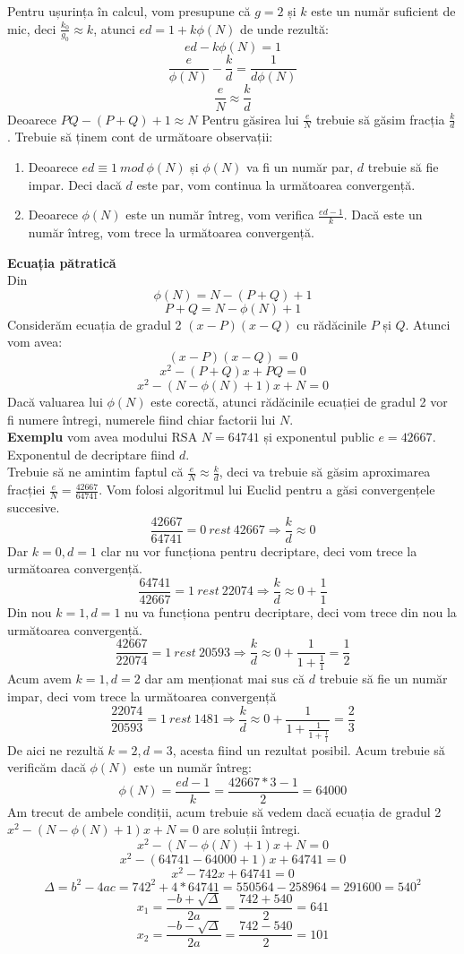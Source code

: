 \documentclass[12]{article}
\begin{document}
Pentru ușurința în calcul, vom presupune că $g=2$ și $k$ este un număr suficient de mic, deci $\frac{k_0}{g_0} \approx k$, atunci $ed = 1+k\phi(N)$ de unde rezultă:
$$ ed-k\phi(N)=1$$
$$ \frac{e}{\phi(N)} - \frac{k}{d} = \frac{1}{d\phi(N)}$$
$$ \frac{e}{N} \approx \frac{k}{d} $$ 
Deoarece $PQ - (P+Q)+1 \approx N$
Pentru găsirea lui $\frac{e}{N}$ trebuie să găsim fracția $\frac{k}{d}$. Trebuie să ținem cont de următoare observații:
\begin{enumerate}
\item Deoarece $ed \equiv 1 \ mod \ \phi(N)$ și $\phi(N)$ va fi un număr par, $d$ trebuie să fie impar. Deci dacă $d$ este par, vom continua la următoarea convergență.

\item Deoarece $\phi(N)$ este un număr întreg, vom verifica  $\frac{ed -1}{k}$. Dacă este un număr întreg, vom trece la următoarea convergență.

\end{enumerate}
\textbf{Ecuația pătratică} \\
Din
$$ \phi(N)=N-(P+Q)+1$$
$$ P+Q = N - \phi(N) +1$$
Considerăm ecuația de gradul 2 $(x-P)(x-Q)$ cu rădăcinile $P$ și $Q$. Atunci vom avea:
$$(x-P)(x-Q)=0$$
$$x^2 - (P+Q)x + PQ = 0$$
$$x^2 - (N- \phi(N)+1)x + N =0$$
Dacă valuarea lui $\phi(N)$ este corectă, atunci rădăcinile ecuației de gradul 2 vor fi numere întregi, numerele fiind chiar factorii lui $N$. \\

\textbf{Exemplu} vom avea modului RSA $N=64741$ și exponentul public $e=42667$. Exponentul de decriptare fiind $d$.\\
Trebuie să ne amintim faptul că $ \frac{e}{N} \approx \frac{k}{d}$, deci va trebuie să găsim aproximarea fracției $\frac{e}{N} = \frac{42667}{64741}$. Vom folosi algoritmul lui Euclid pentru a găsi convergențele succesive. \\
$$\frac{42667}{64741}= 0 \ rest \ 42667 \Rightarrow \frac{k}{d} \approx 0 $$
Dar $k=0, d=1$ clar nu vor funcționa pentru decriptare, deci vom trece la următoarea convergență.
$$ \frac{64741}{42667} = 1 \ rest \ 22074 \Rightarrow \frac{k}{d} \approx 0 + \frac{1}{1}$$
Din nou $k=1,d=1$ nu va funcționa pentru decriptare, deci vom trece din nou la următoarea convergență.
$$ \frac{42667}{22074} = 1 \ rest \ 20593 \Rightarrow \frac{k}{d} \approx 0 + \frac{1}{1+\frac{1}{1}} = \frac{1}{2}$$ 
Acum avem $k=1,d=2$ dar am menționat mai sus că $d$ trebuie să fie un număr impar, deci vom trece la următoarea convergență
$$ \frac{22074}{20593} = 1 \ rest \ 1481 \Rightarrow \frac{k}{d} \approx 0 + \frac{1}{1 + \frac{1}{1+\frac{1}{1}}} = \frac{2}{3} $$ 
De aici ne rezultă $k=2,d=3$, acesta fiind un rezultat posibil. Acum trebuie să verificăm dacă $\phi(N)$ este un număr întreg:
$$\phi(N)=\frac{ed-1}{k}=\frac{42667 * 3 -1}{2}=64000$$
Am trecut de ambele condiții, acum trebuie să vedem dacă ecuația de gradul 2 $x^2 - (N- \phi(N) +1)x +N=0$ are soluții întregi.
$$x^2 - (N- \phi(N)+1)x+N=0$$
$$x^2 - (64741 - 64000 +1)x + 64741=0$$
$$x^2 - 742x + 64741=0$$
$$ \Delta = b^2 - 4ac = 742^2 + 4*64741 = 550564 - 258964 = 291600 = 540^{2} $$
$$x_1 = \frac{-b + \sqrt{\Delta}}{2a} = \frac{742 + 540}{2} = 641$$ 
$$x_2 = \frac{-b - \sqrt{\Delta}}{2a} = \frac{742 - 540}{2} = 101$$
\end{document}
